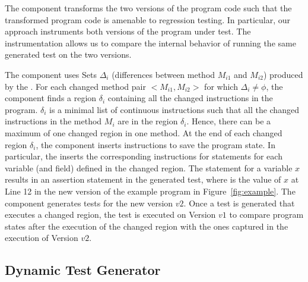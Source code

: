 The  component transforms the two versions of the program code such that the transformed program code is amenable to regression testing. In particular, our approach instruments both versions of the program under test. The instrumentation allows us to compare the internal behavior of running the same generated test on the two versions. 

The  component uses Sets $\Delta_i$ (differences between method $M_{i1}$ and $M_{i2}$) produced by the . For each changed method pair $<M_{i1}, M_{i2}>$ for which $\Delta_i \neq \phi$, the  component finds a region $\delta_i$ containing all the changed instructions in the program. $\delta_i$ is a minimal list of continuous instructions such that all the changed instructions in the method $M_i$ are in the region $\delta_i$. Hence, there can be a maximum of one changed region in one method. At the end of each changed region $\delta_i$, the  component inserts instructions to save the program state. In particular, the  inserts the corresponding instructions for  statements for each variable (and field) defined in the changed region.
The  statement for a variable $x$ results in an assertion statement  in the generated test, where  is the value of $x$ at Line 12 in the new version of the example program in Figure~\ref{fig:example}.
The  component generates tests for the new version $v2$.
Once a test is generated that executes a changed region, 
the test is executed on Version $v1$ 
to compare program states after the execution of the changed region
with the ones captured in the execution of Version $v2$.



\subsection{Dynamic Test Generator}


